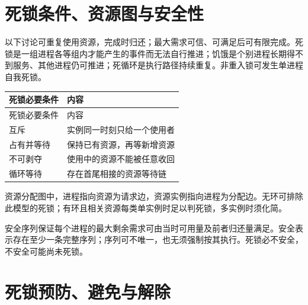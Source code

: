 \section{死锁条件、资源图与安全性}\label{OS02-deadlock}

以下讨论可重复使用资源，完成时归还；最大需求可信、可满足后可有限完成。死锁是一组进程各等组内才能产生的事件而无法自行推进；饥饿是个别进程长期得不到服务、其他进程仍可推进；死循环是执行路径持续重复。非重入锁可发生单进程自我死锁。

\par\smallskip
{\fontsize{9.3}{12}\selectfont\setlength{\tabcolsep}{2.5pt}\setlength{\LTleft}{0pt}\setlength{\LTright}{0pt}
\begin{longtable}{@{}>{\raggedright\arraybackslash}p{}>{\raggedright\arraybackslash}p{}@{}}
\toprule
死锁必要条件 & 内容 \\

\midrule\endfirsthead\toprule
死锁必要条件 & 内容 \\

\midrule\endhead\bottomrule\endfoot
互斥 & 实例同一时刻只给一个使用者 \\

占有并等待 & 保持已有资源，再等新增资源 \\

不可剥夺 & 使用中的资源不能被任意收回 \\

循环等待 & 存在首尾相接的资源等待链 \\

\end{longtable}}
\par\smallskip

资源分配图中，进程指向资源为请求边，资源实例指向进程为分配边。无环可排除此模型的死锁；有环且相关资源每类单实例时足以判死锁，多实例时须化简。

安全序列保证每个进程的最大剩余需求可由当时可用量及前者归还量满足。安全表示存在至少一条完整序列；序列可不唯一，也无须强制按其执行。死锁必不安全，不安全可能尚未死锁。


\section{死锁预防、避免与解除}\label{OS02-deadlock-strategies}

